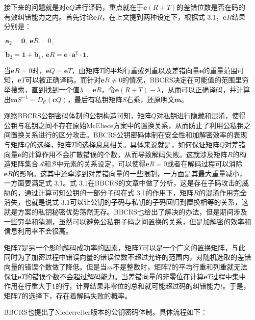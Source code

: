 \begin{breakablealgorithm}
\begin{algorithmic}
		接下来的问题就是对$\mathbf{c}Q$进行译码，重点就在于$\mathbf{e}(R + T)$的差错位数是否在码的有效纠错能力之内。首先讨论$\mathbf{e}R$，在上文提到两种设定下，根据式 3.1，$\mathbf{e}R$结果分别是：
		\begin{center}
			$~\mathbf{a}_2 = \mathbf{0},~\mathbf{e}R = 0,$
			
			$~\mathbf{b}_2=\mathbf{1} + \mathbf{b}_1,~\mathbf{e}R = \mathbf{e} \cdot \mathbf{a}^\mathtt{T} \cdot \mathbf{1}.$
		\end{center}
		当$\mathbf{e}R = 0$时，$\mathbf{e}Q = \mathbf{e}T$，由矩阵$T$的平均行重或列重以及差错向量$\mathbf{e}$的重量范围可知，$\mathbf{e}T$可以被正确译码。而针对$\mathbf{e}R \neq 0$的情况，BBCRS决定在可能值的范围里穷举搜索，直到找到一个值$\lambda = \mathbf{e}R$，令$\mathbf{e}(R + T) - \lambda$，从而可以正确译码，并计算出$\mathbf{m}S^{-1} = D_\mathcal{C}(\mathbf{c}Q)$，最后有私钥矩阵$S$右乘，还原明文$\mathbf{m}$。
	\end{algorithmic}
\end{breakablealgorithm}

观察BBCRS公钥密码体制的公钥构造可知，矩阵$Q$对私钥进行隐藏和混淆，使得公钥与私钥之间不存在原始McEliece方案中的置换关系，从而防止了利用公私钥之间置换关系进行的区分攻击。BBCRS公钥密码体制在安全性和加解密效率的表现与矩阵$Q$的选择，矩阵$T$的选择息息相关。具体来说就是，如何保证矩阵$Q$对差错向量$\mathbf{e}$的计算作用不会扩散错误的个数，从而导致解码失败。这就涉及矩阵$R$的构造矩阵集合$\mathcal{A}$和$\mathcal{B}$中元素的关系设定，可以使得$\mathbf{e}R = 0$或者在解码过程可以消除$\mathbf{e}R$的影响。这其中还牵涉到对差错向量的一些限制，一方面是其最大重量减小，一方面要满足式 3.1。式 3.1在BBCRS的文章中做了分析，这是存在子码攻击的威胁的，通过计算可知公钥的一部分子码在式 3.1的作用下，矩阵$R$的混淆作用完全消失，也就是说式 3.1可以让公钥的子码与私钥的子码回归到置换相等的关系，这就是方案的私钥秘密优势荡然无存。BBCRS也给出了解决的办法，但是期间涉及一些穷举和猜测，虽然可以避免公私钥子码之间置换的关系，但是加解密的效率和信息利用率不会很高。

矩阵$T$是另一个影响解码成功率的因素，矩阵$T$可以是一个广义的置换矩阵，与此同时为了加密过程中错误向量的错误位数不超过允许的范围内，对随机选取的差错向量的错误个数做了降低。但是当$m$不是整数时，矩阵$T$的平均行重和列重就无法保证$\mathbf{e}T$的错误个数不会超过解码能力。当差错向量的非零位在计算$\mathbf{e}T$过程中集中作用在行重大于$1$的行，计算结果非零位的总和就可能超过码的纠错能力$t$。于是，矩阵$T$的选择下，存在着解码失败的概率。

BBCRS也提出了Niederreiter版本的公钥密码体制。具体流程如下：

